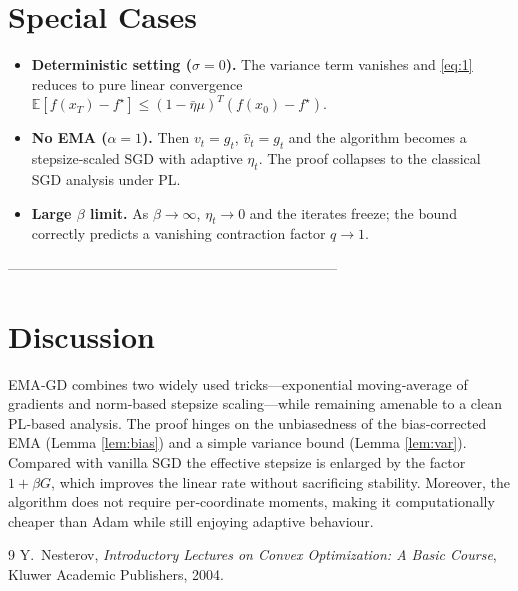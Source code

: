 \documentclass{article}
\newcommand{\EE}{\mathbb{E}}
\begin{document}
\section*{Special Cases}
\begin{itemize}[leftmargin=*,nosep]
    \item \textbf{Deterministic setting ($\sigma=0$).} The variance term vanishes and \eqref{eq:1} reduces to pure linear convergence $ \EE[f(x_{T})-f^{\star}]\le (1-\bar\eta\mu)^{T}(f(x_{0})-f^{\star})$.
    \item \textbf{No EMA ($\alpha=1$).} Then $v_{t}=g_{t}$, $\hat v_{t}=g_{t}$ and the algorithm becomes a stepsize‑scaled SGD with adaptive $\eta_{t}$. The proof collapses to the classical SGD analysis under PL.
    \item \textbf{Large $\beta$ limit.} As $\beta\to\infty$, $\eta_{t}\to 0$ and the iterates freeze; the bound correctly predicts a vanishing contraction factor $q\to 1$.
\end{itemize}

-----------------------------------------------------------------------

\section*{Discussion}
EMA‑GD combines two widely used tricks—exponential moving‑average of gradients and norm‑based stepsize scaling—while remaining amenable to a clean PL‑based analysis. The proof hinges on the unbiasedness of the bias‑corrected EMA (Lemma \ref{lem:bias}) and a simple variance bound (Lemma \ref{lem:var}). Compared with vanilla SGD the effective stepsize is enlarged by the factor $1+\beta G$, which improves the linear rate without sacrificing stability. Moreover, the algorithm does not require per‑coordinate moments, making it computationally cheaper than Adam while still enjoying adaptive behaviour.

\begin{thebibliography}{9}
Y.~Nesterov, \emph{Introductory Lectures on Convex Optimization: A Basic Course}, Kluwer Academic Publishers, 2004.
\end{thebibliography}
\end{document}
